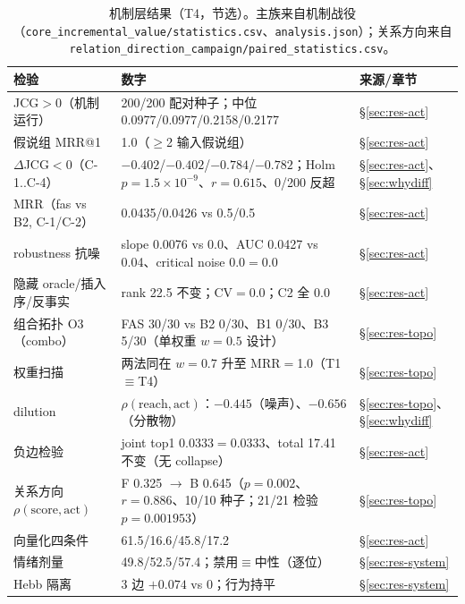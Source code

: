 \documentclass[10pt,a4paper]{ctexart}
\begin{document}
\begin{table}[t]
\centering\small
\caption{机制层结果（T4，节选）。主族来自机制战役（\texttt{core\_incremental\_value/statistics.csv}、\texttt{analysis.json}）；关系方向来自 \texttt{relation\_direction\_campaign/paired\_statistics.csv}。}
\label{tab:mechanism}
\begin{tabular}{L{4.6cm}L{5.6cm}L{4.2cm}}
\toprule
\textbf{检验} & \textbf{数字} & \textbf{来源/章节} \\
\midrule
JCG$>$0（机制运行） & 200/200 配对种子；中位 0.0977/0.0977/0.2158/0.2177 & \S\ref{sec:res-act} \\
假说组 MRR@1 & 1.0（$\ge$2 输入假说组） & \S\ref{sec:res-act} \\
$\Delta$JCG$<$0（C-1..C-4） & ${-}0.402$/${-}0.402$/${-}0.784$/${-}0.782$；Holm $p{=}1.5\times10^{-9}$、$r{=}0.615$、0/200 反超 & \S\ref{sec:res-act}、\S\ref{sec:whydiff} \\
MRR（fas vs B2, C-1/C-2） & 0.0435/0.0426 vs 0.5/0.5 & \S\ref{sec:res-act} \\
robustness 抗噪 & slope 0.0076 vs 0.0、AUC 0.0427 vs 0.04、critical noise 0.0$=$0.0 & \S\ref{sec:res-act} \\
隐藏 oracle/插入序/反事实 & rank 22.5 不变；CV$=$0.0；C2 全 0.0 & \S\ref{sec:res-act} \\
组合拓扑 O3（combo） & FAS 30/30 vs B2 0/30、B1 0/30、B3 5/30（单权重 $w{=}0.5$ 设计） & \S\ref{sec:res-topo} \\
权重扫描 & 两法同在 $w{=}0.7$ 升至 MRR$=$1.0（T1$\equiv$T4） & \S\ref{sec:res-topo} \\
dilution & $\rho(\mathrm{reach},\mathrm{act})$：$-0.445$（噪声）、$-0.656$（分散物） & \S\ref{sec:res-topo}、\S\ref{sec:whydiff} \\
负边检验 & joint top1 0.0333$=$0.0333、total 17.41 不变（无 collapse） & \S\ref{sec:res-act} \\
关系方向 $\rho(\mathrm{score},\mathrm{act})$ & F 0.325 $\rightarrow$ B 0.645（$p{=}0.002$、$r{=}0.886$、10/10 种子；21/21 检验 $p{=}0.001953$） & \S\ref{sec:res-topo} \\
向量化四条件 & 61.5/16.6/45.8/17.2 & \S\ref{sec:res-act} \\
情绪剂量 & 49.8/52.5/57.4；禁用$\equiv$中性（逐位） & \S\ref{sec:res-system} \\
Hebb 隔离 & 3 边 $+0.074$ vs 0；行为持平 & \S\ref{sec:res-system} \\
\bottomrule
\end{tabular}
\end{table}
\end{document}
